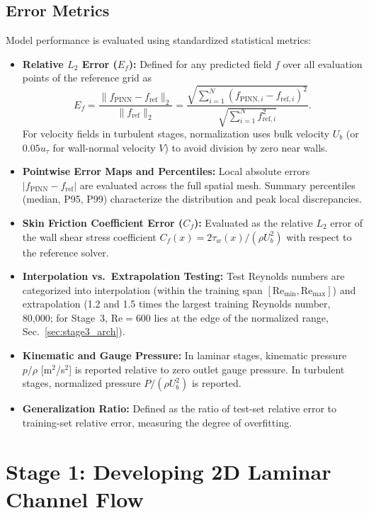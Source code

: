 \documentclass[11pt,a4paper]{article}
\begin{document}
\subsection{Error Metrics}
\label{sec:error_metrics}
Model performance is evaluated using standardized statistical metrics:
\begin{itemize}[leftmargin=1.5em]
    \item \textbf{Relative $L_2$ Error ($E_f$):} Defined for any predicted field $f$ over all evaluation points of the reference grid as
    \begin{equation}
    E_f = \frac{\|f_{\mathrm{PINN}} - f_{\mathrm{ref}}\|_2}{\|f_{\mathrm{ref}}\|_2} = \frac{\sqrt{\sum_{i=1}^N (f_{\mathrm{PINN},i} - f_{\mathrm{ref},i})^2}}{\sqrt{\sum_{i=1}^N f_{\mathrm{ref},i}^2}}.
    \end{equation}
    For velocity fields in turbulent stages, normalization uses bulk velocity $U_b$ (or $0.05 u_\tau$ for wall-normal velocity $V$) to avoid division by zero near walls.
    \item \textbf{Pointwise Error Maps and Percentiles:} Local absolute errors $|f_{\mathrm{PINN}} - f_{\mathrm{ref}}|$ are evaluated across the full spatial mesh. Summary percentiles (median, P95, P99) characterize the distribution and peak local discrepancies.
    \item \textbf{Skin Friction Coefficient Error ($C_f$):} Evaluated as the relative $L_2$ error of the wall shear stress coefficient $C_f(x) = 2\tau_w(x) / (\rho U_b^2)$ with respect to the reference solver.
    \item \textbf{Interpolation vs.\ Extrapolation Testing:} Test Reynolds numbers are categorized into interpolation (within the training span $[\mathrm{Re}_{\min}, \mathrm{Re}_{\max}]$) and extrapolation (1.2 and 1.5 times the largest training Reynolds number, 80,000; for Stage~3, $\mathrm{Re}=600$ lies at the edge of the normalized range, Sec.~\ref{sec:stage3_arch}).
    \item \textbf{Kinematic and Gauge Pressure:} In laminar stages, kinematic pressure $p/\rho$ [m$^2$/s$^2$] is reported relative to zero outlet gauge pressure. In turbulent stages, normalized pressure $P/(\rho U_b^2)$ is reported.
    \item \textbf{Generalization Ratio:} Defined as the ratio of test-set relative error to training-set relative error, measuring the degree of overfitting.
\end{itemize}


\section{Stage 1: Developing 2D Laminar Channel Flow}
\label{sec:stage1}
\end{document}
